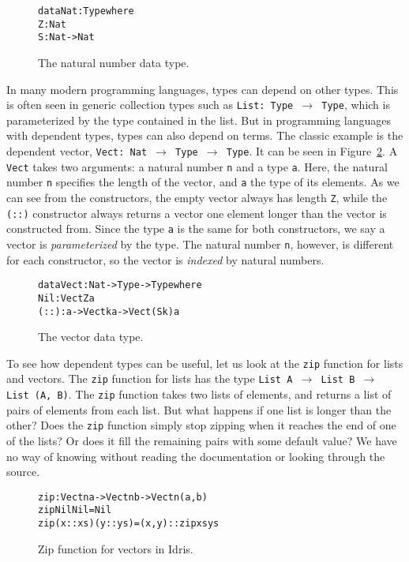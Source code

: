 \begin{figure}
\begin{alltt}
data Nat : Type where
  Z : Nat
  S : Nat -> Nat
\end{alltt}
\caption{The natural number data type.}
\label{fig:nat}
\end{figure}

In many modern programming languages, types can depend on other types. This is often seen in generic collection types such as \texttt{List: Type $\to$ Type}, which is parameterized by the type contained in the list. But in programming languages with dependent types, types can also depend on terms. The classic example is the dependent vector, \texttt{Vect: Nat $\to$ Type $\to$ Type}. It can be seen in Figure~\ref{fig:vect}. A \texttt{Vect} takes two arguments: a natural number \texttt{n} and a type \texttt{a}. Here, the natural number \texttt{n} specifies the length of the vector, and \texttt{a} the type of its elements. As we can see from the constructors, the empty vector always has length \texttt{Z}, while the \texttt{(::)} constructor always returns a vector one element longer than the vector is constructed from. Since the type \texttt{a} is the same for both constructors, we say a vector is \emph{parameterized} by the type. The natural number \texttt{n}, however, is different for each constructor, so the vector is \emph{indexed} by natural numbers.

\begin{figure}
\begin{alltt}
data Vect : Nat -> Type -> Type where
  Nil  : Vect Z a
  (::) : a -> Vect k a -> Vect (S k) a
\end{alltt}
\caption{The vector data type.}
\label{fig:vect}
\end{figure}

To see how dependent types can be useful, let us look at the \texttt{zip} function for lists and vectors. The \texttt{zip} function for lists has the type \texttt{List A $\to$ List B $\to$ List (A, B)}. The \texttt{zip} function takes two lists of elements, and returns a list of pairs of elements from each list. But what happens if one list is longer than the other? Does the \texttt{zip} function simply stop zipping when it reaches the end of one of the lists? Or does it fill the remaining pairs with some default value? We have no way of knowing without reading the documentation or looking through the source.

\begin{figure}
\begin{alltt}
zip : Vect n a -> Vect n b -> Vect n (a, b)
zip Nil       Nil       = Nil
zip (x :: xs) (y :: ys) = (x, y) :: zip xs ys
\end{alltt}
\caption{Zip function for vectors in Idris.}
\label{fig:zip}
\end{figure}

